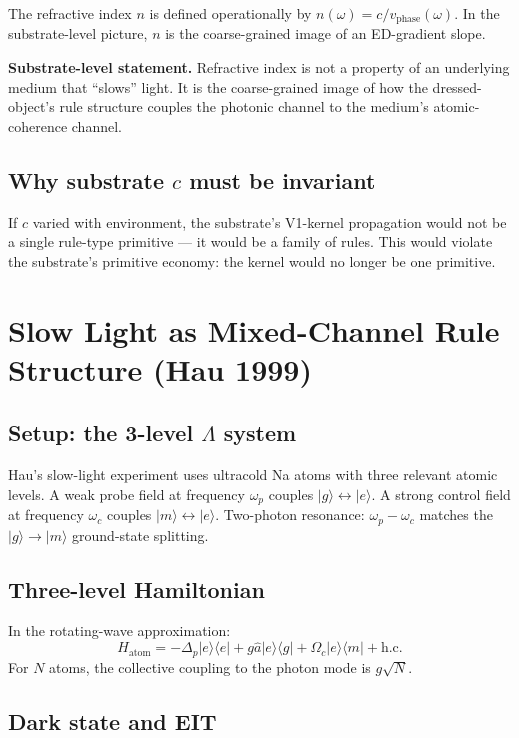\documentclass[11pt,a4paper]{article}
\begin{document}
The refractive index $n$ is defined operationally by $n(\omega) = c/v_{\mathrm{phase}}(\omega)$. In the substrate-level picture, $n$ is the coarse-grained image of an ED-gradient slope.

\textbf{Substrate-level statement.} Refractive index is not a property of an underlying medium that ``slows'' light. It is the coarse-grained image of how the dressed-object's rule structure couples the photonic channel to the medium's atomic-coherence channel.

\subsection{Why substrate $c$ must be invariant}

If $c$ varied with environment, the substrate's V1-kernel propagation would not be a single rule-type primitive --- it would be a family of rules. This would violate the substrate's primitive economy: the kernel would no longer be one primitive.

\section{Slow Light as Mixed-Channel Rule Structure (Hau 1999)}

\subsection{Setup: the 3-level $\Lambda$ system}

Hau's slow-light experiment uses ultracold Na atoms with three relevant atomic levels. A weak probe field at frequency $\omega_p$ couples $|g\rangle \leftrightarrow |e\rangle$. A strong control field at frequency $\omega_c$ couples $|m\rangle \leftrightarrow |e\rangle$. Two-photon resonance: $\omega_p - \omega_c$ matches the $|g\rangle \to |m\rangle$ ground-state splitting.

\subsection{Three-level Hamiltonian}

In the rotating-wave approximation:
\[
H_{\mathrm{atom}} = -\Delta_p|e\rangle\langle e| + g\hat a|e\rangle\langle g| + \Omega_c|e\rangle\langle m| + \mathrm{h.c.}
\]
For $N$ atoms, the collective coupling to the photon mode is $g\sqrt N$.

\subsection{Dark state and EIT}
\end{document}
